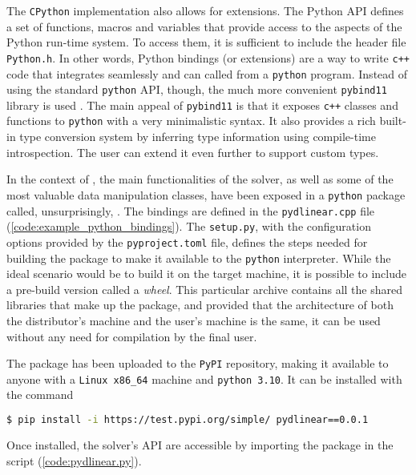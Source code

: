 The \texttt{CPython} implementation also allows for extensions.
The Python API defines a set of functions, macros and variables that provide access to the aspects of the Python run-time system.
To access them, it is sufficient to include the header file \texttt{Python.h}.
In other words, Python bindings (or extensions) are a way to write \texttt{c++} code that integrates seamlessly and can called from a \texttt{python} program.
Instead of using the standard \texttt{python} API, though, the much more convenient \texttt{pybind11} library is used \cite{man:pybind11}.
The main appeal of \texttt{pybind11} is that it exposes \texttt{c++} classes and functions to \texttt{python} with a very minimalistic syntax.
It also provides a rich built-in type conversion system by inferring type information using compile-time introspection.
The user can extend it even further to support custom types.

In the context of \dlinear, the main functionalities of the solver, as well as some of the most valuable data manipulation classes, have been exposed in a \texttt{python} package called, unsurprisingly, \pydlinear.
The bindings are defined in the \texttt{pydlinear.cpp} file (\autoref{code:example_python_bindings}).
The \texttt{setup.py}, with the configuration options provided by the \texttt{pyproject.toml} file, defines the steps needed for building the package to make it available to the \texttt{python} interpreter.
While the ideal scenario would be to build it on the target machine, it is possible to include a pre-build version called a \textit{wheel}.
This particular archive contains all the shared libraries that make up the package, and provided that the architecture of both the distributor's machine and the user's machine is the same, it can be used without any need for compilation by the final user.



The package has been uploaded to the \texttt{PyPI} repository, making it available to anyone with a \texttt{Linux x86\_64} machine and \texttt{python 3.10}.
It can be installed with the command

\begin{lstlisting}[language=bash,frame=single,showstringspaces=false]
$ pip install -i https://test.pypi.org/simple/ pydlinear==0.0.1
\end{lstlisting}
Once installed, the solver's API are accessible by importing the \pydlinear package in the script (\autoref{code:pydlinear.py}).

